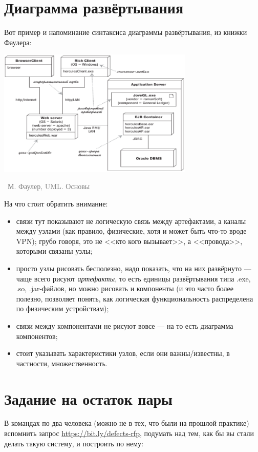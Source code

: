 \documentclass[a5paper]{article}
\newcommand{\attribution}[1] {
    \vspace{-5mm}\begin{flushright}\begin{scriptsize}\textcolor{gray}{\textcopyright\, #1}\end{scriptsize}\end{flushright}
}
\begin{document}
\section{Диаграмма развёртывания}

Вот пример и напоминание синтаксиса диаграммы развёртывания, из книжки Фаулера:

\begin{center}
    \includegraphics[width=0.7\textwidth]{deploymentDiagram.png}
    \attribution{М. Фаулер, UML. Основы}
\end{center}

На что стоит обратить внимание:

\begin{itemize}
    \item связи тут показывают не логическую связь между артефактами, а каналы между узлами (как правило, физические, хотя и может быть что-то вроде VPN); грубо говоря, это не <<кто кого вызывает>>, а <<провода>>, которыми связаны узлы;
    \item просто узлы рисовать бесполезно, надо показать, что на них развёрнуто --- чаще всего рисуют \emph{артефакты}, то есть единицы развёртывания типа .exe, .so, .jar-файлов, но можно рисовать и компоненты (и это часто более полезно, позволяет понять, как логическая функциональность распределена по физическим устройствам);
    \item связи между компонентами не рисуют вовсе --- на то есть диаграмма компонентов;
    \item стоит указывать характеристики узлов, если они важны/известны, в частности, множественность.
\end{itemize}

\section{Задание на остаток пары}

В командах по два человека (можно не в тех, что были на прошлой практике) вспомнить запрос \url{https://bit.ly/defects-rfp}, подумать над тем, как бы вы стали делать такую систему, и построить по нему:
\end{document}
